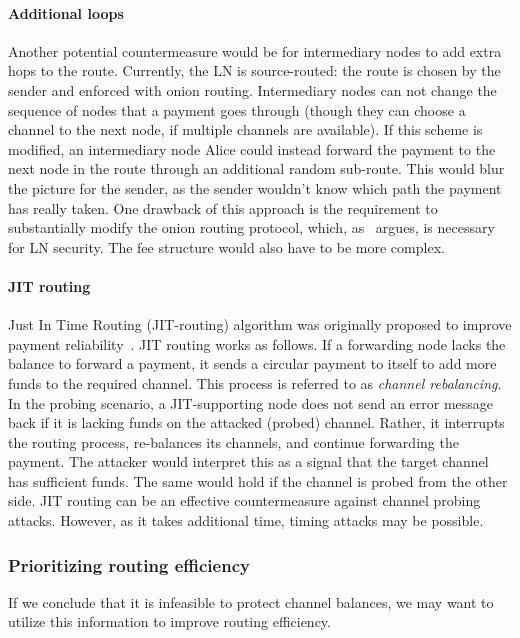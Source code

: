 \paragraph{Additional loops}
Another potential countermeasure would be for intermediary nodes to add extra hops to the route.
Currently, the LN is source-routed: the route is chosen by the sender and enforced with onion routing.
Intermediary nodes can not change the sequence of nodes that a payment goes through (though they can choose a channel to the next node, if multiple channels are available).
If this scheme is modified, an intermediary node Alice could instead forward the payment to the next node in the route through an additional random sub-route.
This would blur the picture for the sender, as the sender wouldn't know which path the payment has really taken.
One drawback of this approach is the requirement to substantially modify the onion routing protocol, which, as~\cite{Malavolta2019} argues, is necessary for LN security.
The fee structure would also have to be more complex.

\paragraph{JIT routing}
Just In Time Routing (JIT-routing) algorithm was originally proposed to improve payment reliability~\cite{Pickhardt2019, Pickhardt2019a}.
JIT routing works as follows.
If a forwarding node lacks the balance to forward a payment, it sends a circular payment to itself to add more funds to the required channel.
This process is referred to as \textit{channel rebalancing}.
In the probing scenario, a JIT-supporting node does not send an error message back if it is lacking funds on the attacked (probed) channel.
Rather, it interrupts the routing process, re-balances its channels, and continue forwarding the payment.
The attacker would interpret this as a signal that the target channel has sufficient funds.
The same would hold if the channel is probed from the other side.
JIT routing can be an effective countermeasure against channel probing attacks.
However, as it takes additional time, timing attacks may be possible. 


\subsubsection*{Prioritizing routing efficiency}

If we conclude that it is infeasible to protect channel balances, we may want to utilize this information to improve routing efficiency.

